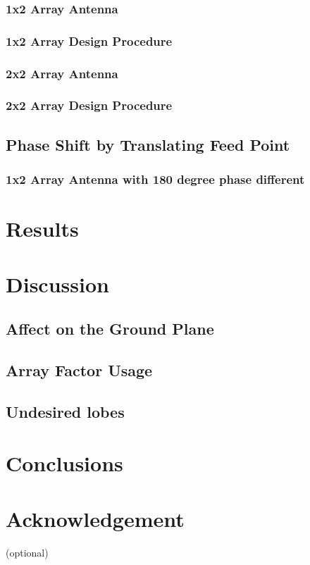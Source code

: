\documentclass[11pt,a4paper]{article}
\begin{document}
\subsubsection{1x2 Array Antenna}
\subsubsection{1x2 Array Design Procedure}
\subsubsection{2x2 Array Antenna}
\subsubsection{2x2 Array Design Procedure}
\subsection{Phase Shift by Translating Feed Point}
\subsubsection{1x2 Array Antenna with 180 degree phase different}


\section{Results}

\section{Discussion}
\subsection{Affect on the Ground Plane}
\subsection{Array Factor Usage}
\subsection{Undesired lobes}

\section{Conclusions}

\section{Acknowledgement}
(optional)
\end{document}

